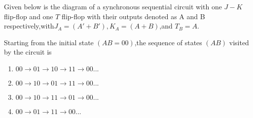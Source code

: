  Given below  is the diagram of a synchronous sequential circuit with one $J-K$ flip-flop and one $T$ flip-flop with their outputs denoted as A and B respectively,with$J_A = (A'+B'),K_A = (A+B)$,and $T_B = A.$


\begin{figure}[H]
        \centering
	
        \caption{}
        \label{fig:fig:1}
\end{figure}

   
    Starting from the initial state $(AB=00)$,the sequence of states $(AB)$ visited by the circuit is
    \begin{enumerate}
	    \item $00\rightarrow01\rightarrow10\rightarrow11\rightarrow00 ...$
        \item $00\rightarrow10\rightarrow01\rightarrow11\rightarrow00 ...$
        \item $00\rightarrow10\rightarrow11\rightarrow01\rightarrow00 ...$
        \item $00\rightarrow01\rightarrow11\rightarrow00 ...$
    \end{enumerate}

